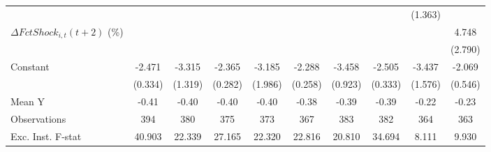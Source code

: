{\begin{tabular}{l*{9}{c}}
                    &                     &                     &                     &                     &                     &                     &                     &     (1.363)         &                     \\
\addlinespace
$ \Delta FctShock_{i,t}(t+2)$ (\%)&                     &                     &                     &                     &                     &                     &                     &                     &       4.748         \\
                    &                     &                     &                     &                     &                     &                     &                     &                     &     (2.790)         \\
\addlinespace
Constant            &      -2.471\sym{***}&      -3.315\sym{**} &      -2.365\sym{***}&      -3.185         &      -2.288\sym{***}&      -3.458\sym{***}&      -2.505\sym{***}&      -3.437\sym{**} &      -2.069\sym{***}\\
                    &     (0.334)         &     (1.319)         &     (0.282)         &     (1.986)         &     (0.258)         &     (0.923)         &     (0.333)         &     (1.576)         &     (0.546)         \\
\midrule
Mean Y              &       -0.41         &       -0.40         &       -0.40         &       -0.40         &       -0.38         &       -0.39         &       -0.39         &       -0.22         &       -0.23         \\
Observations        &         394         &         380         &         375         &         373         &         367         &         383         &         382         &         364         &         363         \\
Exc. Inst. F-stat   &      40.903         &      22.339         &      27.165         &      22.320         &      22.816         &      20.810         &      34.694         &       8.111         &       9.930         \\
\bottomrule
\end{tabular}
}
